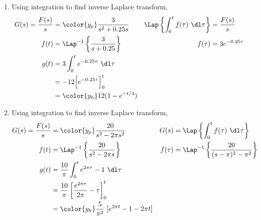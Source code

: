 \begin{enumerate}
    \item Using integration to find inverse Laplace transform,
          \begin{align}
              G(s) = \frac{F(s)}{s}       & = \color{y_p} \frac{3}{s^2 + 0.25s}   &
              \Lap\left\{ \int_{0}^{t}f(\tau)
              \ \dl \tau \right\}         & =  \frac{F(s)}{s}                       \\
              f(t)                        & = \Lap^{-1}\left\{
              \frac{3}{s + 0.25} \right\} &
              f(\tau)                     & =  3e^{-0.25\tau}                       \\
              g(t)                        & =3\int_{0}^{t}e^{-0.25\tau}\ \dl \tau   \\
                                          & = -12 \Big[ e^{-0.25\tau} \Big]_0^t     \\
                                          & = \color{y_h} 12(1 - e^{-t/4})
          \end{align}

    \item Using integration to find inverse Laplace transform,
          \begin{align}
              G(s) = \frac{F(s)}{s}   & = \color{y_p} \frac{20}{s^3 - 2\pi s^2} &
              G(s)                    & = \Lap\left\{ \int_{0}^{t}f(\tau)
              \ \dl \tau \right\}                                                 \\
              f(t)                    & = \Lap^{-1}\left\{ \frac{20}
              {s^2 - 2\pi s} \right\} &
              f(\tau)                 & =  \Lap^{-1}\left\{ \frac{20}
              {(s-\pi)^2 - \pi^2} \right\}                                        \\
              g(t)                    & = \frac{10}{\pi}\int_{0}^{t}
              e^{2\pi \tau} - 1\ \dl \tau                                         \\
                                      & = \frac{10}{\pi}
              \left[ \frac{e^{2\pi \tau}}{2\pi} - \tau \right]_0^t                \\
                                      & = \color{y_h}\frac{5}{\pi^2}\
              [e^{2\pi t} - 1 - 2\pi t]
          \end{align}


\end{enumerate}
